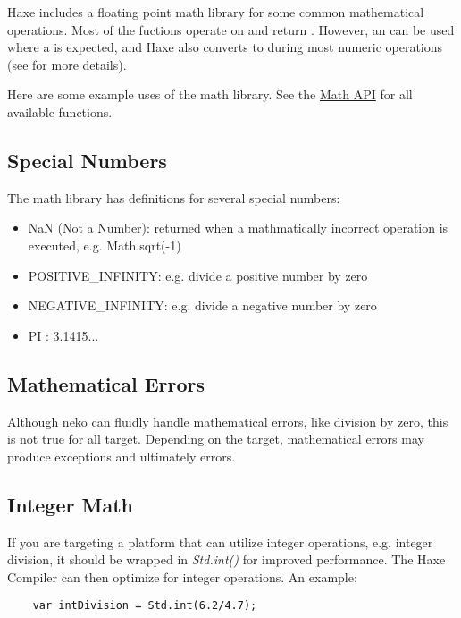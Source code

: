Haxe includes a floating point math library for some common mathematical operations.  Most of the fuctions operate on and return .  However, an  can be used where a  is expected, and Haxe also converts  to  during most numeric operations  (see  for more details).

Here are some example uses of the math library.  See the \href{http://api.haxe.org/Math.html}{Math API} for all available functions.


\subsection{Special Numbers}
\label{std-math-special-numbers}
The math library has definitions for several special numbers:
\begin{itemize}
	\item NaN (Not a Number): returned when a mathmatically incorrect operation is executed, e.g. Math.sqrt(-1)
	\item POSITIVE_INFINITY: e.g. divide a positive number by zero
	\item NEGATIVE_INFINITY: e.g. divide a negative number by zero
	\item PI : 3.1415...
\end{itemize}

\subsection{Mathematical Errors}
\label{std-math-mathematical-errors}
Although neko can fluidly handle mathematical errors, like division by zero, this is not true for all target.  Depending on the target, mathematical errors may produce exceptions and ultimately errors.

\subsection{Integer Math}
\label{std-math-integer-math}
If you are targeting a platform that can utilize integer operations, e.g. integer division, it should be wrapped in \emph{Std.int()} for improved performance.  The Haxe Compiler can then optimize for integer operations.  An example:
\begin{lstlisting}
	var intDivision = Std.int(6.2/4.7);
\end{lstlisting}

